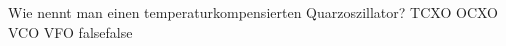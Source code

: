     {Wie nennt man einen temperaturkompensierten Quarzoszillator?}
    {TCXO}
    {OCXO}
    {VCO}
    {VFO}
    {false}{false}
